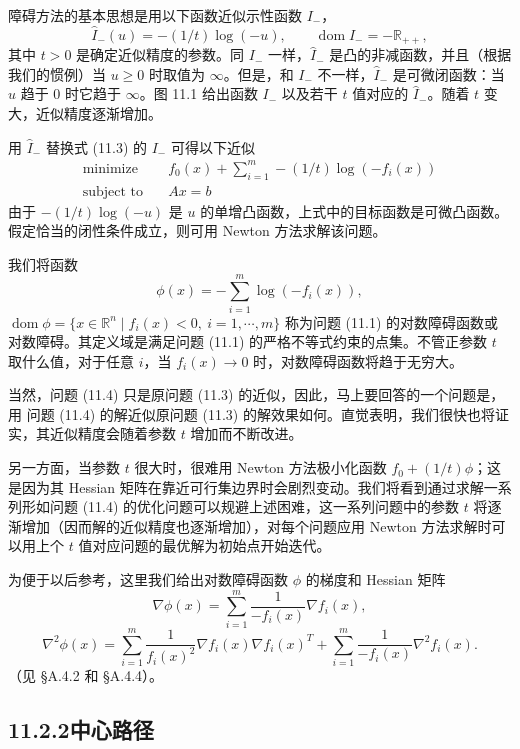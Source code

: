 \documentclass[UTF8, 12pt, fontset=fandol, oneside]{ctexart}
\begin{document}
障碍方法的基本思想是用以下函数近似示性函数 $I_-$，
\[
\hat{I}_-(u)=-(1/t)\log(-u),\qquad \operatorname{dom}\hat{I}_-=-\mathbb{R}_{++},
\]
其中 $t>0$ 是确定近似精度的参数。同 $I_-$ 一样，$\hat{I}_-$ 是凸的非减函数，并且（根据我们的惯例）当 $u\geq 0$ 时取值为 $\infty$。但是，和 $I_-$ 不一样，$\hat{I}_-$ 是可微闭函数：当 $u$ 趋于 $0$ 时它趋于 $\infty$。图 11.1 给出函数 $I_-$ 以及若干 $t$ 值对应的 $\hat{I}_-$。随着 $t$ 变大，近似精度逐渐增加。

用 $\hat{I}_-$ 替换式 (11.3) 的 $I_-$ 可得以下近似
\begin{equation}
\begin{aligned}
\text{minimize}\quad & f_0(x)+\sum_{i=1}^m -(1/t)\log(-f_i(x))\\
\text{subject to}\quad & Ax=b
\end{aligned}
\tag{11.4}
\end{equation}
由于 $-(1/t)\log(-u)$ 是 $u$ 的单增凸函数，上式中的目标函数是可微凸函数。假定恰当的闭性条件成立，则可用 Newton 方法求解该问题。

我们将函数
\begin{equation}
\phi(x)=-\sum_{i=1}^m\log(-f_i(x)),
\tag{11.5}
\end{equation}
$\operatorname{dom}\phi=\{x\in\mathbb{R}^n\mid f_i(x)<0,\ i=1,\cdots,m\}$ 称为问题 (11.1) 的对数障碍函数或对数障碍。其定义域是满足问题 (11.1) 的严格不等式约束的点集。不管正参数 $t$ 取什么值，对于任意 $i$，当 $f_i(x)\to 0$ 时，对数障碍函数将趋于无穷大。

当然，问题 (11.4) 只是原问题 (11.3) 的近似，因此，马上要回答的一个问题是，用
问题 (11.4) 的解近似原问题 (11.3) 的解效果如何。直觉表明，我们很快也将证实，其近似精度会随着参数 $t$ 增加而不断改进。

另一方面，当参数 $t$ 很大时，很难用 Newton 方法极小化函数 $f_0+(1/t)\phi$；这是因为其 Hessian 矩阵在靠近可行集边界时会剧烈变动。我们将看到通过求解一系列形如问题 (11.4) 的优化问题可以规避上述困难，这一系列问题中的参数 $t$ 将逐渐增加（因而解的近似精度也逐渐增加），对每个问题应用 Newton 方法求解时可以用上个 $t$ 值对应问题的最优解为初始点开始迭代。

为便于以后参考，这里我们给出对数障碍函数 $\phi$ 的梯度和 Hessian 矩阵
\[
\nabla\phi(x)=\sum_{i=1}^m \frac{1}{-f_i(x)}\nabla f_i(x),
\]
\[
\nabla^2\phi(x)=\sum_{i=1}^m \frac{1}{f_i(x)^2}\nabla f_i(x)\nabla f_i(x)^T+\sum_{i=1}^m \frac{1}{-f_i(x)}\nabla^2 f_i(x).
\]
（见 \S A.4.2 和 \S A.4.4）。

\subsection*{11.2.2\quad 中心路径}
\end{document}
